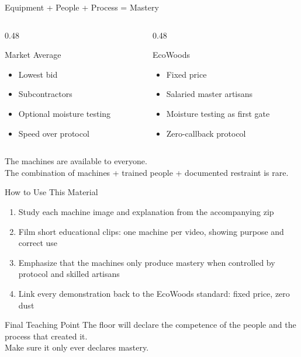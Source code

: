 \documentclass[aspectratio=169,10pt]{beamer}
\begin{document}
\begin{frame}{Equipment + People + Process = Mastery}
\begin{columns}[T]
\begin{column}{0.48\textwidth}
\begin{block}{Market Average}
\begin{itemize}
  \item Lowest bid
  \item Subcontractors
  \item Optional moisture testing
  \item Speed over protocol
\end{itemize}
\end{block}
\end{column}
\begin{column}{0.48\textwidth}
\begin{alertblock}{EcoWoods}
\begin{itemize}
  \item Fixed price
  \item Salaried master artisans
  \item Moisture testing as first gate
  \item Zero-callback protocol
\end{itemize}
\end{alertblock}
\end{column}
\end{columns}
\vspace{0.25cm}
\begin{center}
The machines are available to everyone.\\
The combination of machines + trained people + documented restraint is rare.
\end{center}
\end{frame}

\begin{frame}{How to Use This Material}
\begin{enumerate}
  \item Study each machine image and explanation from the accompanying zip
  \item Film short educational clips: one machine per video, showing purpose and correct use
  \item Emphasize that the machines only produce mastery when controlled by protocol and skilled artisans
  \item Link every demonstration back to the EcoWoods standard: fixed price, zero dust
\end{enumerate}
\vspace{0.25cm}
\begin{block}{Final Teaching Point}
The floor will declare the competence of the people and the process that created it.\\
Make sure it only ever declares mastery.
\end{block}
\end{frame}
\end{document}
